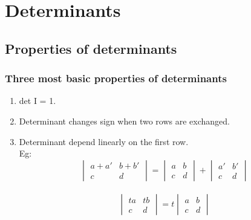 \section{Determinants}

\subsection{Properties of determinants}
\subsubsection{Three most basic properties of determinants}

\begin{enumerate}
\item det I = 1.
\item Determinant changes sign when two rows are exchanged.
\item Determinant depend linearly on the first row.\\
Eg: 
$$
\begin{vmatrix}
	a + a' & b + b'\\
	c & d	
\end{vmatrix}
=
\begin{vmatrix}
	a & b\\
	c & d	
\end{vmatrix}
+
\begin{vmatrix}
	a' & b'\\
	c & d	
\end{vmatrix}
$$\\

$$
\begin{vmatrix}
	ta & tb\\
	c & d
\end{vmatrix}
=
t
\begin{vmatrix}
	a & b\\
	c & d	
\end{vmatrix}
$$
 
\end{enumerate}

